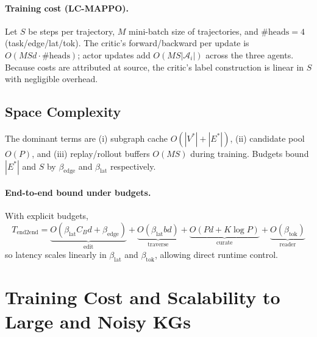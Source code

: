\documentclass{article} %
\begin{document}
\paragraph{Training cost (LC-MAPPO).}
Let $S$ be steps per trajectory, $M$ mini-batch size of trajectories, and $\#\text{heads}=4$ (task/edge/lat/tok). The critic’s forward/backward per update is $O(M S d \cdot \#\text{heads})$; actor updates add $O(M S |\mathcal{A}_i|)$ across the three agents. Because costs are attributed at source, the critic’s label construction is linear in $S$ with negligible overhead.

\subsection{Space Complexity}
The dominant terms are (i) subgraph cache $O(|V^\ast|+|E^\ast|)$, (ii) candidate pool $O(P)$, and (iii) replay/rollout buffers $O(M S)$ during training. Budgets bound $|E^\ast|$ and $S$ by $\beta_{\text{edge}}$ and $\beta_{\text{lat}}$ respectively.

\paragraph{End-to-end bound under budgets.}
With explicit budgets,
\[
T_{\text{end2end}}
=\underbrace{O(\beta_{\text{lat}} C_B d + \beta_{\text{edge}})}_{\text{edit}}
+\underbrace{O(\beta_{\text{lat}} b d)}_{\text{traverse}}
+\underbrace{O(P d + K \log P)}_{\text{curate}}
+\underbrace{O(\beta_{\text{tok}})}_{\text{reader}}
\]
so latency scales linearly in $\beta_{\text{lat}}$ and $\beta_{\text{tok}}$, allowing direct runtime control.



\newpage

\section{Training Cost and Scalability to Large and Noisy KGs}
\label{app:train-cost-scale}
\end{document}
